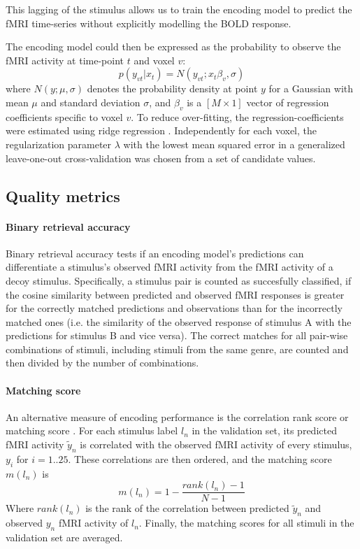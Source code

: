 This lagging of the stimulus allows us to train the encoding model to predict
the f{MRI} time-series without explicitly modelling the BOLD response.

The encoding model could then be expressed as the probability to observe the f{MRI} activity at time-point $t$ and voxel $v$:
%
\begin{equation}
  \label{eq:encmo}
  p(y_{vt}|x_{t}) = N(y_{vt};x_{t}\beta_{v},\sigma)
\end{equation}
%
where $N(y;\mu,\sigma)$ denotes the probability density at point $y$ for a
Gaussian with mean $\mu$ and standard deviation $\sigma$, and $\beta_{v}$ is a
$[M\times1]$ vector of regression coefficients specific to voxel $v$. To reduce
over-fitting, the regression-coefficients were estimated using ridge regression
\citep{HK70}.  Independently for each voxel, the regularization parameter
$\lambda$ with the lowest mean squared error in a generalized leave-one-out
cross-validation \citep{GHW79} was chosen from a set of candidate values.

\subsection*{Quality metrics} 

\paragraph{Binary retrieval accuracy}

Binary retrieval accuracy \citep{ML08} tests if an encoding model's predictions
can differentiate a stimulus's observed f{MRI} activity from the f{MRI} activity
of a decoy stimulus.
Specifically, a stimulus pair is counted as succesfully classified, if the cosine similarity between predicted and
observed f{MRI} responses is greater for the correctly matched predictions and
observations than for the incorrectly matched ones (i.e. the similarity of the observed response of
stimulus A with the predictions for stimulus B and vice versa).
The correct matches for all pair-wise combinations of stimuli, including stimuli from the
same genre, are counted and then divided by the number of combinations.

\paragraph{Matching score}
%
An alternative measure of encoding performance is the correlation rank score or
matching score \citep{SF14}. For each stimulus label $l_{n}$ in the validation set,
its predicted f{MRI} activity $\widetilde{y}_{n}$ is correlated with the
observed f{MRI} activity of every stimulus, $y_{i}$ for $i=1..25$. These
correlations are then ordered, and the  matching score $m(l_{n})$ is \[
m(l_{n}) = 1-\frac{rank(l_{n})-1}{N-1} \] Where $rank(l_{n})$ is the rank of
the correlation between predicted $\widetilde{y}_{n}$ and observed $y_{n}$
f{MRI} activity of $l_{n}$. Finally, the matching scores for all stimuli in the
validation set are averaged.



